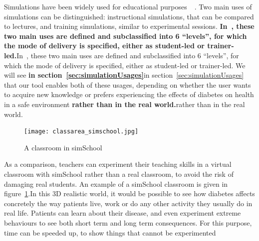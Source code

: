\documentclass[12pt,MSc]{muthesis}
\newcommand{\warn}[1]{\ifdefined\debug\textbf{#1}\else#1\fi}
\begin{document}
Simulations have been widely used for educational purposes\warn{~\cite{ellington1981games}}. Two main uses of simulations can be distinguished: instructional simulations, that can be compared to lectures, and training simulations, similar to experimental sessions. \warn{In~\cite{alinier2007typology}, these two main uses are defined and subclassified into 6 ``levels'', for which the mode of delivery is specified, either as student-led or trainer-led.} We will see \warn{in section~\ref{sec:simulationUsages}} that our tool enables both of these usages, depending on whether the user wants to acquire new knowledge or prefers experiencing the effects of diabetes on health in a safe environment \warn{rather than in the real world.} 

\begin{figure}[h]
  \caption{A classroom in simSchool}
  \centering
  \texttt{[image: classarea\_simschool.jpg]}
  \label{fig:classarea_simschool}
\end{figure}


As a comparison, teachers can experiment their teaching skills in a virtual classroom with simSchool rather than a real classroom, to avoid the risk of damaging real students. An example of a simSchool classroom is given in figure~\ref{fig:classarea_simschool}.In this 3D realistic world, it would be possible to see how diabetes affects concretely the way patients live, work or do any other activity they usually do in real life. Patients can learn about their disease, and even experiment extreme %
behaviours to see both short term and long term consequences. For this purpose, time can be speeded up, to show things that cannot be experimented %
\end{document}
